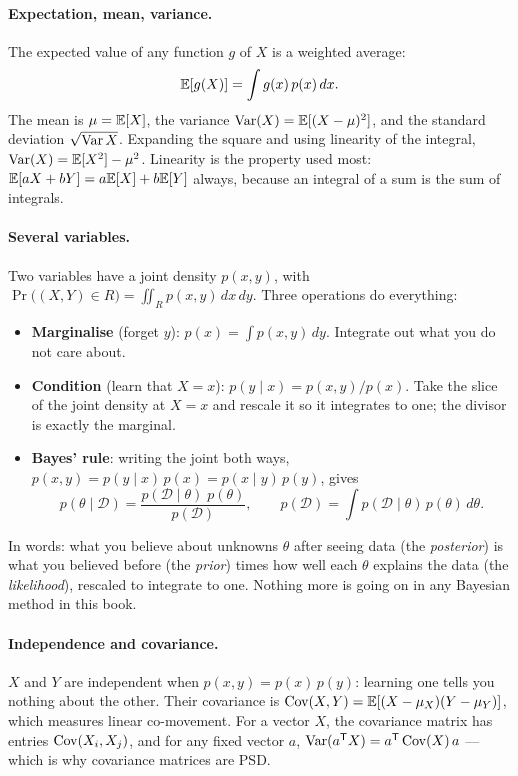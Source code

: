 \paragraph{Expectation, mean, variance.} The expected value of any function $g$ of $X$ is a weighted average:
\begin{equation}
  \mathbb{E}[g(X)] = \int g(x)\, p(x)\, dx .
\end{equation}
The mean is $\mu = \mathbb{E}[X]$, the variance $\operatorname{Var}(X) = \mathbb{E}[(X - \mu)^2]$, and the standard deviation $\sqrt{\operatorname{Var} X}$.
Expanding the square and using linearity of the integral, $\operatorname{Var}(X) = \mathbb{E}[X^2] - \mu^2$. Linearity is the property
used most: $\mathbb{E}[aX + bY] = a\mathbb{E}[X] + b\mathbb{E}[Y]$ always, because an integral of a sum is the sum of integrals.

\paragraph{Several variables.} Two variables have a joint density $p(x, y)$, with $\Pr\big((X,Y) \in R\big) =
\iint_R p(x,y)\,dx\,dy$. Three operations do everything:
\begin{itemize}[nosep]
  \item \textbf{Marginalise} (forget $y$): $p(x) = \int p(x, y)\, dy$. Integrate out what you do not care about.
  \item \textbf{Condition} (learn that $X = x$): $p(y \mid x) = p(x, y)/p(x)$. Take the slice of the joint density at
        $X = x$ and rescale it so it integrates to one; the divisor is exactly the marginal.
  \item \textbf{Bayes' rule}: writing the joint both ways, $p(x,y) = p(y\mid x)\,p(x) = p(x\mid y)\,p(y)$, gives
        \begin{equation}
          p(\theta \mid \mathcal{D}) = \frac{p(\mathcal{D} \mid \theta)\; p(\theta)}{p(\mathcal{D})},
          \qquad p(\mathcal{D}) = \int p(\mathcal{D}\mid\theta)\,p(\theta)\,d\theta .
          \label{eq:bayes}
        \end{equation}
\end{itemize}
In words: what you believe about unknowns $\theta$ after seeing data (the \emph{posterior}) is what you believed
before (the \emph{prior}) times how well each $\theta$ explains the data (the \emph{likelihood}), rescaled to integrate
to one. Nothing more is going on in any Bayesian method in this book.

\paragraph{Independence and covariance.} $X$ and $Y$ are independent when $p(x,y) = p(x)\,p(y)$: learning one tells
you nothing about the other. Their covariance is $\operatorname{Cov}(X,Y) = \mathbb{E}[(X - \mu_X)(Y - \mu_Y)]$, which measures linear
co-movement. For a vector $X$, the covariance matrix has entries $\operatorname{Cov}(X_i, X_j)$, and for any fixed vector $a$,
$\operatorname{Var}(a^{\mathsf{T}} X) = a^{\mathsf{T}} \operatorname{Cov}(X)\, a$ --- which is why covariance matrices are PSD.


